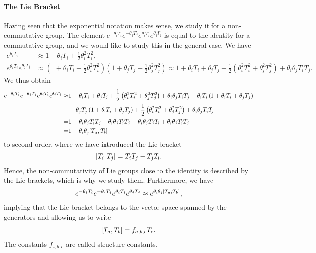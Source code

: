 \paragraph{The Lie Bracket}
Having seen that the exponential notation makes sense, we study it for a non-commutative group. The element $e^{-\theta_{i}T_{i}}e^{-\theta_{j}T_{j}}e^{\theta_{i}T_{i}}e^{\theta_{j}T_{j}}$ is equal to the identity for a commutative group, and we would like to study this in the general case. We have
\begin{align*}
	e^{\theta_{i}T_{i}}                    &\approx 1 + \theta_{i}T_{i} + \frac{1}{2}\theta_{i}^{2}T_{i}^{2}, \\
	e^{\theta_{i}T_{i}}e^{\theta_{j}T_{j}} &\approx \left(1 + \theta_{i}T_{i} + \frac{1}{2}\theta_{i}^{2}T_{i}^{2}\right)\left(1 + \theta_{j}T_{j} + \frac{1}{2}\theta_{j}^{2}T_{j}^{2}\right) \approx 1 + \theta_{i}T_{i} + \theta_{j}T_{j} + \frac{1}{2}\left(\theta_{i}^{2}T_{i}^{2} + \theta_{j}^{2}T_{j}^{2}\right) + \theta_{i}\theta_{j}T_{i}T_{j}.
\end{align*}
We thus obtain
\begin{align*}
	e^{-\theta_{i}T_{i}}e^{-\theta_{j}T_{j}}e^{\theta_{i}T_{i}}e^{\theta_{j}T_{j}} \approx& 1 + \theta_{i}T_{i} + \theta_{j}T_{j} + \frac{1}{2}\left(\theta_{i}^{2}T_{i}^{2} + \theta_{j}^{2}T_{j}^{2}\right) + \theta_{i}\theta_{j}T_{i}T_{j} - \theta_{i}T_{i}\left(1 + \theta_{i}T_{i} + \theta_{j}T_{j}\right) \\
	 &- \theta_{j}T_{j}\left(1 + \theta_{i}T_{i} + \theta_{j}T_{j}\right) + \frac{1}{2}\left(\theta_{i}^{2}T_{i}^{2} + \theta_{j}^{2}T_{j}^{2}\right) + \theta_{i}\theta_{j}T_{i}T_{j} \\
	=& 1 + \theta_{i}\theta_{j}T_{i}T_{j} - \theta_{i}\theta_{j}T_{i}T_{j} - \theta_{i}\theta_{j}T_{j}T_{i} + \theta_{i}\theta_{j}T_{i}T_{j} \\
	=& 1 + \theta_{i}\theta_{j}\comm{T_{a}}{T_{b}}
\end{align*}
to second order, where we have introduced the Lie bracket
\begin{align*}
	\comm{T_{i}}{T_{j}} = T_{i}T_{j} - T_{j}T_{i}.
\end{align*}
Hence, the non-commutativity of Lie groups close to the identity is described by the Lie brackets, which is why we study them. Furthermore, we have
\begin{align*}
	e^{-\theta_{i}T_{i}}e^{-\theta_{j}T_{j}}e^{\theta_{i}T_{i}}e^{\theta_{j}T_{j}} \approx e^{\theta_{i}\theta_{j}\comm{T_{a}}{T_{b}}},
\end{align*}
implying that the Lie bracket belongs to the vector space spanned by the generators and allowing us to write
\begin{align*}
	\comm{T_{a}}{T_{b}} = f_{a, b, c}T_{c}.
\end{align*}
The constants $f_{a, b, c}$ are called structure constants.

